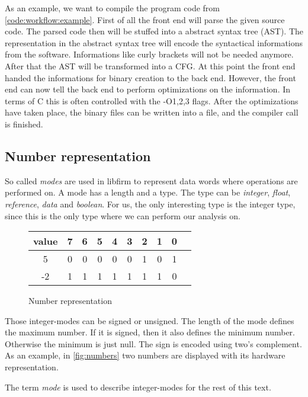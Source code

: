 As an example, we want to compile the program code from \ref{code:workflow:example}.
First of all the front end will parse the given source code. The parsed code then will be stuffed into a abstract syntax tree (AST). The representation in the abstract syntax tree will encode the syntactical informations from the software. Informations like curly brackets will not be needed anymore. \newline
After that the AST will be transformed into a CFG. \newline
At this point the front end handed the informations for binary creation to the back end. However, the front end can now tell the back end to perform optimizations on the information. In terms of C this is often controlled with the -O{1,2,3} flags. \newline
After the optimizations have taken place, the binary files can be written into a file, and the compiler call is finished.

\subsection{Number representation}
So called \textit{modes} are used in libfirm to represent data words where operations are performed on. A mode has a length and a type. The type can be \textit{integer}, \textit{float}, \textit{reference}, \textit{data} and \textit{boolean}. For us, the only interesting type is the integer type, since this is the only type where we can perform our analysis on.

\begin{figure}
	\centering
	\begin{tabular}{c | c c c c c c c c c}
		value & 7 & 6 & 5 & 4 & 3 & 2 & 1 & 0 \\
		\hline
		5     & 0 & 0 & 0 & 0 & 0 & 1 & 0 & 1 \\
		-2    & 1 & 1 & 1 & 1 & 1 & 1 & 1 & 0 \\
	\end{tabular}
	\caption{Number representation}
	\label{fig:numbers}
\end{figure}

Those integer-modes can be signed or unsigned. The length of the mode defines the maximum number. If it is signed, then it also defines the minimum number. Otherwise the minimum is just null. The sign is encoded using two's complement. As an example, in \autoref{fig:numbers} two numbers are displayed with its hardware representation.

The term \textit{mode} is used to describe integer-modes for the rest of this text.


